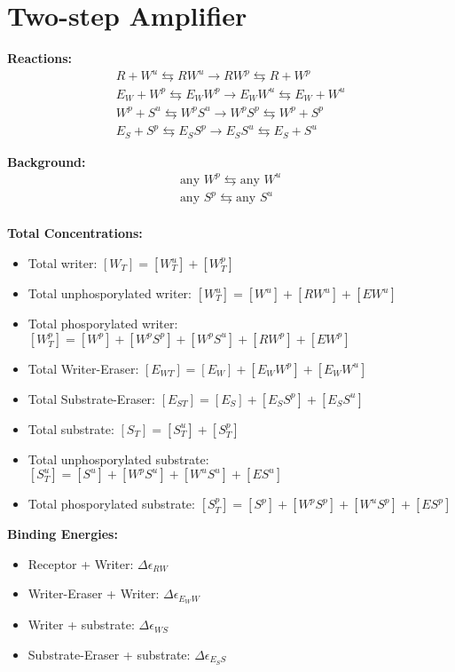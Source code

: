 \documentclass[aps,onecolumn,superscriptaddress,notitlepage]{revtex4-1}
\begin{document}
\section{Two-step Amplifier}

\textbf{Reactions:}
\begin{gather}
R + W^u \leftrightarrows RW^u \rightarrow RW^p \leftrightarrows R + W^p\\
E_W + W^p \leftrightarrows E_WW^p \rightarrow E_WW^u \leftrightarrows E_W + W^u\\
W^p + S^u \leftrightarrows W^pS^u \rightarrow W^pS^p \leftrightarrows W^p + S^p\\
E_S + S^p \leftrightarrows E_SS^p \rightarrow E_SS^u \leftrightarrows E_S + S^u
\end{gather}

\textbf{Background:}
\begin{gather}
\text{any } W^p \leftrightarrows \text{any } W^u\\
\text{any } S^p \leftrightarrows \text{any } S^u\\
\end{gather}

\textbf{Total Concentrations:}
\begin{itemize}
\item Total writer: $[W_T] = [W^u_T] + [W^p_T]$
\item Total unphosporylated writer: $[W^u_T] = [W^u] + [RW^u] + [EW^u]$
\item Total phosporylated writer: $[W^p_T] = [W^p] + [W^pS^p] + [W^pS^u] + [RW^p] + [EW^p]$
\item Total Writer-Eraser: $[E_{WT}] = [E_W]  + [E_WW^p] + [E_WW^u]$
\item Total Substrate-Eraser: $[E_{ST}] = [E_S]  + [E_SS^p] + [E_SS^u]$
\item Total substrate: $[S_T] = [S^u_T] + [S^p_T]$
\item Total unphosporylated substrate: $[S^u_T] = [S^u] + [W^pS^u] + [W^uS^u] + [ES^u]$
\item Total phosporylated substrate: $[S^p_T] = [S^p] +  [W^pS^p] + [W^uS^p] + [ES^p]$
\end{itemize}


\textbf{Binding Energies:}
\begin{itemize}
\item Receptor + Writer: $\Delta\epsilon_{RW}$
\item Writer-Eraser + Writer: $\Delta\epsilon_{E_WW}$
\item Writer + substrate: $\Delta\epsilon_{WS}$
\item Substrate-Eraser + substrate: $\Delta\epsilon_{E_SS}$
\end{itemize}
\end{document}
